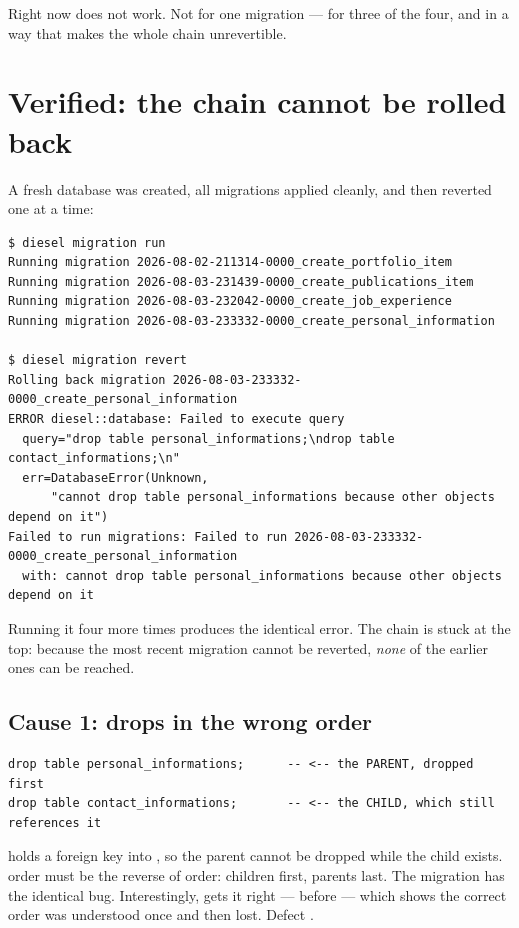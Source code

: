 Right now  does not work. Not for one migration --- for three of the four, and in a way
that makes the whole chain unrevertible.

\section{Verified: the chain cannot be rolled back}

\begin{verified}
A fresh database was created, all migrations applied cleanly, and then reverted one at a time:
\begin{lstlisting}[style=out]
$ diesel migration run
Running migration 2026-08-02-211314-0000_create_portfolio_item
Running migration 2026-08-03-231439-0000_create_publications_item
Running migration 2026-08-03-232042-0000_create_job_experience
Running migration 2026-08-03-233332-0000_create_personal_information

$ diesel migration revert
Rolling back migration 2026-08-03-233332-0000_create_personal_information
ERROR diesel::database: Failed to execute query
  query="drop table personal_informations;\ndrop table contact_informations;\n"
  err=DatabaseError(Unknown,
      "cannot drop table personal_informations because other objects depend on it")
Failed to run migrations: Failed to run 2026-08-03-233332-0000_create_personal_information
  with: cannot drop table personal_informations because other objects depend on it
\end{lstlisting}
Running it four more times produces the identical error. The chain is stuck at the top: because the
most recent migration cannot be reverted, \emph{none} of the earlier ones can be reached.
\end{verified}

\subsection{Cause 1: drops in the wrong order}

\begin{lstlisting}[style=sql,caption={\file{2026-08-03-233332-0000\_create\_personal\_information/down.sql}}]
drop table personal_informations;      -- <-- the PARENT, dropped first
drop table contact_informations;       -- <-- the CHILD, which still references it
\end{lstlisting}

 holds a foreign key into , so the parent
cannot be dropped while the child exists.  order must be the reverse of 
order: children first, parents last. The  migration has the identical
bug. Interestingly,  gets it right ---  before
 --- which shows the correct order was understood once and then
lost. Defect .

